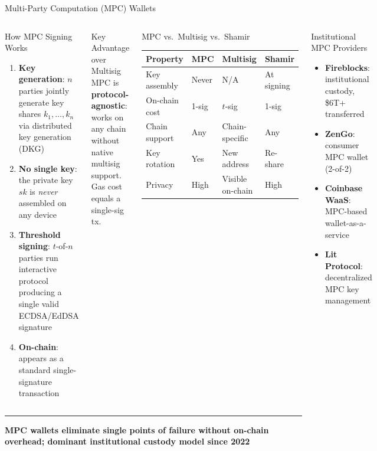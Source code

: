 \documentclass[8pt,aspectratio=169]{beamer}
\newcommand{\bottomnote}[1]{\vfill\vspace{-2mm}\textcolor{mllavender2}{\rule{\textwidth}{0.4pt}}\vspace{1mm}\footnotesize\textbf{#1}}
\begin{document}
\begin{frame}{Multi-Party Computation (MPC) Wallets}
\begin{columns}
\begin{block}{\textcolor{mlblue}{How MPC Signing Works}}
\begin{enumerate}\small
  \item \textbf{Key generation}: $n$ parties jointly generate key shares $k_1, \ldots, k_n$ via distributed key generation (DKG)
  \item \textbf{No single key}: the private key $sk$ is \emph{never} assembled on any device
  \item \textbf{Threshold signing}: $t$-of-$n$ parties run interactive protocol producing a single valid ECDSA/EdDSA signature
  \item \textbf{On-chain}: appears as a standard single-signature transaction
\end{enumerate}
\end{block}
\vspace{2mm}
\begin{alertblock}{Key Advantage over Multisig}
\small MPC is \textbf{protocol-agnostic}: works on any chain without native multisig support. Gas cost equals a single-sig tx.
\end{alertblock}
\begin{block}{\textcolor{mlpurple}{MPC vs.\ Multisig vs.\ Shamir}}
\scriptsize
\begin{tabular}{llll}
\toprule
\textbf{Property} & \textbf{MPC} & \textbf{Multisig} & \textbf{Shamir} \\
\midrule
Key assembly & Never & N/A & At signing \\
On-chain cost & 1-sig & $t$-sig & 1-sig \\
Chain support & Any & Chain-specific & Any \\
Key rotation & Yes & New address & Re-share \\
Privacy & High & Visible on-chain & High \\
\bottomrule
\end{tabular}
\end{block}
\vspace{2mm}
\begin{block}{Institutional MPC Providers}
\begin{itemize}\small
  \item \textbf{Fireblocks}: institutional custody, \$6T+ transferred
  \item \textbf{ZenGo}: consumer MPC wallet (2-of-2)
  \item \textbf{Coinbase WaaS}: MPC-based wallet-as-a-service
  \item \textbf{Lit Protocol}: decentralized MPC key management
\end{itemize}
\end{block}
\end{columns}
\bottomnote{MPC wallets eliminate single points of failure without on-chain overhead; dominant institutional custody model since 2022}
\end{frame}
\end{document}
